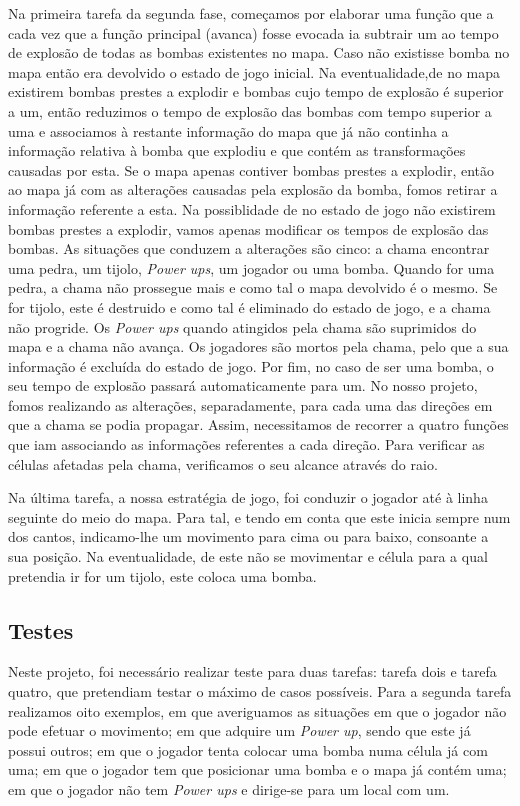 \documentclass[a4paper]{article}
\begin{document}
Na primeira tarefa da segunda fase, começamos por elaborar uma função que a cada vez que a função principal (avanca) fosse evocada ia subtrair um ao tempo de explosão de todas as bombas existentes no mapa. Caso não existisse bomba no mapa então era devolvido o estado de jogo inicial. Na eventualidade,de no mapa existirem bombas prestes a explodir e bombas cujo tempo de explosão é superior a um, então reduzimos o tempo de explosão das bombas com tempo superior a uma e associamos à restante informação do mapa que já não continha a informação relativa à bomba que explodiu e que contém as transformações causadas por esta. Se o mapa apenas contiver bombas prestes a explodir, então ao mapa já com as alterações causadas pela explosão da bomba, fomos retirar a informação referente a esta. Na possiblidade de no estado de jogo não existirem bombas prestes a explodir, vamos apenas modificar os tempos de explosão das bombas. As situações que conduzem a alterações são cinco: a chama encontrar uma pedra, um tijolo, \textit{Power ups}, um jogador ou uma bomba. Quando for uma pedra, a chama não prossegue mais e como tal o mapa devolvido é o mesmo. Se for tijolo, este é destruido e como tal é eliminado do estado de jogo, e a chama não progride. Os \textit{Power ups} quando atingidos pela chama são suprimidos do mapa e a chama não avança. Os jogadores são mortos pela chama, pelo que a sua informação é excluída do estado de jogo. Por fim, no caso de ser uma bomba, o seu tempo de explosão passará automaticamente para um. No nosso projeto, fomos realizando as alterações, separadamente, para cada uma das direções em que a chama se podia propagar. Assim, necessitamos de recorrer a quatro funções que iam associando as informações referentes a cada direção. Para verificar as células afetadas pela chama, verificamos o seu alcance através do raio.

Na última tarefa, a nossa estratégia de jogo, foi conduzir o jogador até à linha seguinte do meio do mapa. Para tal, e tendo em conta que este inicia sempre num dos cantos, indicamo-lhe um movimento para cima ou para baixo, consoante a sua posição. Na eventualidade, de este não se movimentar e célula para a qual pretendia ir for um tijolo, este coloca uma bomba. 

\subsection{Testes}
Neste projeto, foi necessário realizar teste para duas tarefas: tarefa dois e tarefa quatro, que pretendiam testar o máximo de casos possíveis. Para a segunda tarefa realizamos oito exemplos, em que averiguamos as situações em que o jogador não pode efetuar o movimento; em que adquire um \textit{Power up}, sendo que este já possui outros; em que o jogador tenta colocar uma bomba numa célula já com uma; em que o jogador tem que posicionar uma bomba e o mapa já contém uma; em que o jogador não tem \textit{Power ups} e dirige-se para um local com um.
\end{document}
